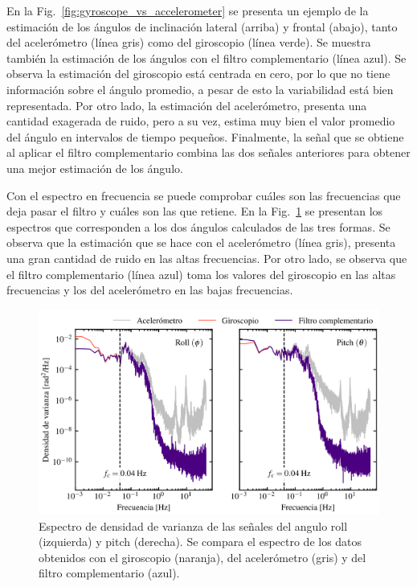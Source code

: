\documentclass[11pt]{article}
\begin{document}
En la Fig.~\ref{fig:gyroscope_vs_accelerometer} se presenta un ejemplo de la
estimación de los ángulos de inclinación lateral (arriba) y frontal (abajo),
tanto del acelerómetro (línea gris) como del giroscopio (línea verde). Se
muestra también la estimación de los ángulos con el filtro complementario (línea
azul). Se observa la estimación del giroscopio está centrada en cero, por lo que
no tiene información sobre el ángulo promedio, a pesar de esto la variabilidad
está bien representada. Por otro lado, la estimación del acelerómetro, presenta
una cantidad exagerada de ruido, pero a su vez, estima muy bien el valor
promedio del ángulo en intervalos de tiempo pequeños. Finalmente, la señal que
se obtiene al aplicar el filtro complementario combina las dos señales
anteriores para obtener una mejor estimación de los ángulo.

Con el espectro en frecuencia se puede comprobar cuáles son las frecuencias que
deja pasar el filtro y cuáles son las que retiene. En la
Fig.~\ref{fig:spectra_pitch_and_roll} se presentan los espectros que
corresponden a los dos ángulos calculados de las tres formas. Se observa que la
estimación que se hace con el acelerómetro (línea gris), presenta una gran
cantidad de ruido en las altas frecuencias. Por otro lado, se observa que el
filtro complementario (línea azul) toma los valores del giroscopio en las altas
frecuencias y los del acelerómetro en las bajas frecuencias.

\begin{figure}[htpb]
  \centering
  \includegraphics[width=0.87\linewidth]{./figures/spectra_pitch_and_roll.png}
  \caption{
    Espectro de densidad de varianza de las señales del angulo roll (izquierda)
    y pitch (derecha). Se compara el espectro de los datos obtenidos con el
    giroscopio (naranja), del acelerómetro (gris) y del filtro complementario
    (azul).
  }
  \label{fig:spectra_pitch_and_roll}
\end{figure}
\end{document}

